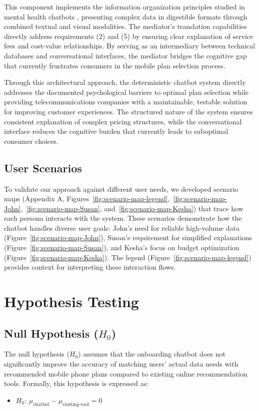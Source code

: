 \documentclass[conference]{IEEEtran}
\begin{document}
This component implements the information organization principles studied in mental health chatbots \cite{b10}, presenting complex data in digestible formats through combined textual and visual modalities. The mediator's translation capabilities directly address requirements (2) and (5) by ensuring clear explanation of service fees and cost-value relationships. By serving as an intermediary between technical databases and conversational interfaces, the mediator bridges the cognitive gap that currently frustrates consumers in the mobile plan selection process.

Through this architectural approach, the deterministic chatbot system directly addresses the documented psychological barriers to optimal plan selection while providing telecommunications companies with a maintainable, testable solution for improving customer experiences. The structured nature of the system ensures consistent explanation of complex pricing structures, while the conversational interface reduces the cognitive burden that currently leads to suboptimal consumer choices.

\subsection{User Scenarios}
To validate our approach against different user needs, we developed scenario maps (Appendix A, Figures~\ref{fig:scenario-map-legend},~\ref{fig:scenario-map-John},~\ref{fig:scenario-map-Susan}, and~\ref{fig:scenario-map-Kesha}) that trace how each persona interacts with the system. These scenarios demonstrate how the chatbot handles diverse user goals: John's need for reliable high-volume data (Figure~\ref{fig:scenario-map-John}), Susan's requirement for simplified explanations (Figure~\ref{fig:scenario-map-Susan}), and Kesha's focus on budget optimization (Figure~\ref{fig:scenario-map-Kesha}). The legend (Figure~\ref{fig:scenario-map-legend}) provides context for interpreting these interaction flows.
\section{Hypothesis Testing}
\subsection{Null Hypothesis ($H_0$)}
The null hypothesis ($H_0$) assumes that the onboarding chatbot does not significantly improve the accuracy of matching users' actual data needs with recommended mobile phone plans compared to existing online recommendation tools. Formally, this hypothesis is expressed as:
\begin{itemize}
\item $H_0$: $\mu_{\text{chatbot}} - \mu_{\text{existing-tool}} = 0$
\end{itemize}
\end{document}
